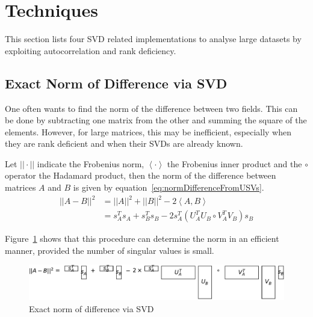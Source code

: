 \documentclass[sigconf]{acmart}
\begin{document}
\section{Techniques}
\label{Techniques}

This section lists four SVD related implementations to analyse large datasets by exploiting autocorrelation and rank deficiency.

\subsection{Exact Norm of Difference via SVD}
\label{sec:Techniques Exact Norm of Difference via SVD}

One often wants to find the norm of the difference between two fields. This can be done by subtracting one matrix from the other and summing the square of the elements. However, for large matrices, this may be inefficient, especially when they are rank deficient and when their SVDs are already known.

Let $|| \cdot ||$ indicate the Frobenius norm, $\left\langle \cdot \right\rangle$ the Frobenius inner product and the $\circ$ operator the Hadamard product, then the norm of the difference between matrices $A$ and $B$ is given by equation~\ref{eq:normDifferenceFromUSVs}.
\begin{equation}
\label{eq:normDifferenceFromUSVs}
\begin{split}
||A-B||^{2} & = ||A||^{2} + ||B||^{2} - 2 \left\langle A, B \right\rangle \\
& = s_{A}^{T} s_{A} + s_{B}^{T} s_{B} - 2 s_{A}^{T} \left( U_{A}^{T} U_{B} \circ V_{A}^{T} V_{B} \right) s_{B}
\end{split}
\end{equation}

Figure~\ref{fig:normDifferenceFromUSVs} shows that this procedure can determine the norm in an efficient manner, provided the number of singular values is small.
\begin{figure}[h]
\begin{center}
\includegraphics[width=\columnwidth]{Results/normDifferenceFromUSVs.pdf}
\caption[Exact norm of difference]{Exact norm of difference via SVD}
\label{fig:normDifferenceFromUSVs}
\end{center}
\end{figure}
\end{document}
